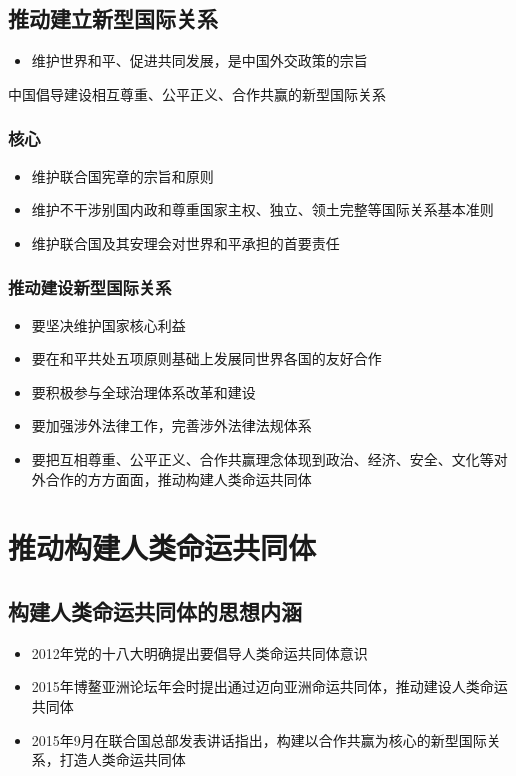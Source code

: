     \subsection{推动建立新型国际关系}
        \begin{itemize}
            \item 维护世界和平、促进共同发展，是中国外交政策的宗旨
        \end{itemize}

        中国倡导建设相互尊重、公平正义、合作共赢的新型国际关系
        \subsubsection{核心}
        \begin{itemize}
            \item 维护联合国宪章的宗旨和原则
            \item 维护不干涉别国内政和尊重国家主权、独立、领土完整等国际关系基本准则
            \item 维护联合国及其安理会对世界和平承担的首要责任
        \end{itemize}

        \subsubsection{推动建设新型国际关系}
        \begin{itemize}
            \item 要坚决维护国家核心利益
            \item 要在和平共处五项原则基础上发展同世界各国的友好合作
            \item 要积极参与全球治理体系改革和建设
            \item 要加强涉外法律工作，完善涉外法律法规体系
            \item 要把互相尊重、公平正义、合作共赢理念体现到政治、经济、安全、文化等对外合作的方方面面，推动构建人类命运共同体
        \end{itemize}


\section{推动构建人类命运共同体}
    \subsection{构建人类命运共同体的思想内涵}
        \begin{itemize}
            \item 2012年党的十八大明确提出要倡导人类命运共同体意识
            \item 2015年博鳌亚洲论坛年会时提出通过迈向亚洲命运共同体，推动建设人类命运共同体
            \item 2015年9月在联合国总部发表讲话指出，构建以合作共赢为核心的新型国际关系，打造人类命运共同体
        \end{itemize}

